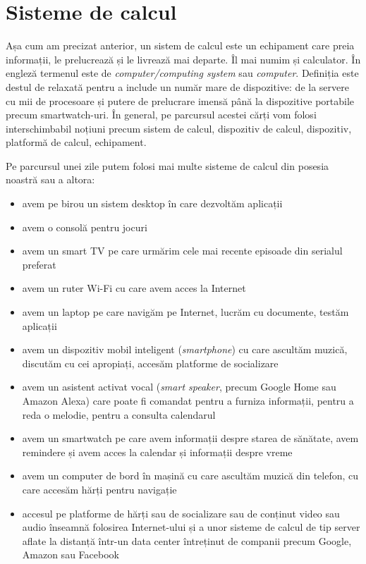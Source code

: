 \section{Sisteme de calcul}
\label{sec:intro:computer-systems}

Așa cum am precizat anterior, un sistem de calcul este un echipament care preia informații, le prelucrează și le livrează mai departe. Îl mai numim și calculator. În engleză termenul este de \textit{computer/computing system} sau \textit{computer}. Definiția este destul de relaxată pentru a include un număr mare de dispozitive: de la servere cu mii de procesoare și putere de prelucrare imensă până la dispozitive portabile precum smartwatch-uri. În general, pe parcursul acestei cărți vom folosi interschimbabil noțiuni precum sistem de calcul, dispozitiv de calcul, dispozitiv, platformă de calcul, echipament.

Pe parcursul unei zile putem folosi mai multe sisteme de calcul din posesia noastră sau a altora:

\begin{itemize}
  \item avem pe birou un sistem desktop în care dezvoltăm aplicații
  \item avem o consolă pentru jocuri
  \item avem un smart TV pe care urmărim cele mai recente episoade din serialul preferat
  \item avem un ruter Wi-Fi cu care avem acces la Internet
  \item avem un laptop pe care navigăm pe Internet, lucrăm cu documente, testăm aplicații
  \item avem un dispozitiv mobil inteligent (\textit{smartphone}) cu care ascultăm muzică, discutăm cu cei apropiați, accesăm platforme de socializare
  \item avem un asistent activat vocal (\textit{smart speaker}, precum Google Home sau Amazon Alexa) care poate fi comandat pentru a furniza informații, pentru a reda o melodie, pentru a consulta calendarul
  \item avem un smartwatch pe care avem informații despre starea de sănătate, avem remindere și avem acces la calendar și informații despre vreme
  \item avem un computer de bord în mașină cu care ascultăm muzică din telefon, cu care accesăm hărți pentru navigație
  \item accesul pe platforme de hărți sau de socializare sau de conținut video sau audio înseamnă folosirea Internet-ului și a unor sisteme de calcul de tip server aflate la distanță într-un data center întreținut de companii precum Google, Amazon sau Facebook
\end{itemize}

